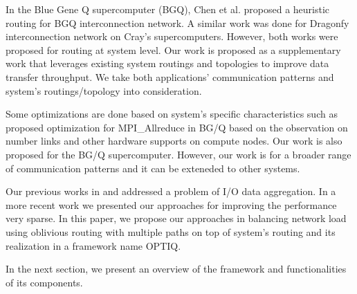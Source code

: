 In the Blue Gene Q supercomputer (BGQ), Chen et al. \cite{Chen:BGQ} proposed a heuristic routing for BGQ interconnection network. A similar work was done for Dragonfy interconnection network on Cray's supercomputers. However, both works were proposed for routing at system level. Our work is proposed as a supplementary work that leverages existing system routings and topologies to improve data transfer throughput. We take both applications' communication patterns and system's routings/topology into consideration. 


Some optimizations are done based on system’s specific characteristics such as \cite{Kumar:Allreduce} proposed optimization for MPI\_Allreduce in BG/Q based on the observation on number links and other hardware supports on compute nodes. Our work is also proposed for the BG/Q supercomputer. However, our work is for a broader range of communication patterns and it can be exteneded to other systems.

Our previous works in \cite{Vishwanath:GLEAN} and \cite{SDAV:Bui2014b} addressed a problem of I/O data aggregation. In a more recent work \cite{hbui:bgq} we presented our approaches for improving the performance very sparse. In this paper, we propose our approaches in balancing network load using oblivious routing with multiple paths on top of system's routing and its realization in a framework name OPTIQ. 

In the next section, we present an overview of the framework and functionalities of its components.
